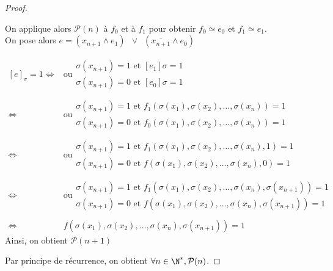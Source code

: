 \begin{proof}
\begin{itemize}[label = $\star$]
		On applique alors $\mathcal P(n)$ à $f_0$ et à $f_1$ pour obtenir $f_0 \simeq e_0$ et $f_1 \simeq e_1$.\\
		On pose alors $e = \left(x_{n+1} \wedge e_1 \right) \enspace \vee \enspace \left(\overline{x_{n+1}} \wedge e_0\right) $
		
		$\begin{array}{rl}
			[e]_\sigma = 1 \Leftrightarrow & \text{ou}\begin{array}{c}
				\sigma (x_{n+1}) = 1 \text{ et } \left[ e_1 \right]\sigma = 1\\
				\sigma  (x_{n+1}) = 0 \text{ et } \left[ e_0 \right]\sigma = 1
			\end{array} \\ \\  \Leftrightarrow  & \text{ou}\begin{array}{c}
				\sigma (x_{n+1}) = 1 \text{ et } f_1\left(\sigma(x_1), \sigma(x_2), \dots, \sigma(x_n)\right) = 1\\
				\sigma  (x_{n+1}) = 0 \text{ et } f_0\left(\sigma(x_1), \sigma(x_2), \dots, \sigma(x_n)\right) = 1
			\end{array} \\\\ \Leftrightarrow & \text{ou}\begin{array}{c}
			\sigma (x_{n+1}) = 1 \text{ et } f_1\left(\sigma(x_1), \sigma(x_2), \dots, \sigma(x_n), 1\right) = 1\\
			\sigma  (x_{n+1}) = 0 \text{ et } f\left(\sigma(x_1), \sigma(x_2), \dots, \sigma(x_n), 0\right) = 1
			\end{array} \\\\ \Leftrightarrow & \text{ou}\begin{array}{c}
			\sigma (x_{n+1}) = 1 \text{ et } f_1\left(\sigma(x_1), \sigma(x_2), \dots, \sigma(x_n), \sigma(x_{n+1})\right) = 1\\
			\sigma  (x_{n+1}) = 0 \text{ et } f\left(\sigma(x_1), \sigma(x_2), \dots, \sigma(x_n), \sigma(x_{n+1})\right) = 1
			\end{array}\\ \\ \Leftrightarrow & f\left(\sigma(x_1), \sigma(x_2), \dots, \sigma(x_n), \sigma(x_{n+1})\right) = 1 
		\end{array}$ \\
		
		Ainsi, on obtient $\mathcal P(n+1)$
	\end{itemize}
	Par principe de récurrence, on obtient $\forall n \in \N^*, \mathcal P(n)$.
\end{proof}

